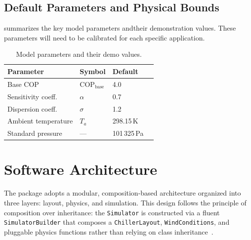 \documentclass[11pt, a4paper]{article}
\newcommand{\cop}{\mathrm{COP}}
\newcommand{\copbase}{\cop_{\mathrm{base}}}
\begin{document}
\subsection{Default Parameters and Physical Bounds}
\label{sec:parameters}

 summarizes the key model parameters andtheir demonstration values. These parameters will need to be calibrated for each specific application.

\begin{table}[htbp]
    \centering
    \caption{Model parameters and their demo values.}
    \label{tab:parameters}
    \begin{tabular}{@{}llll@{}}
        \toprule
        \textbf{Parameter} & \textbf{Symbol} & \textbf{Default} \\
        \midrule
        Base COP              & $\copbase$  & 4.0        \\
        Sensitivity coeff.    & $\alpha$    & 0.7        \\
        Dispersion coeff.     & $\sigma$    & 1.2        \\
        Ambient temperature   & $T_a$       & 298.15\,K   \\
        Standard pressure     & ---         & 101\,325\,Pa \\
        \bottomrule
    \end{tabular}
\end{table}

\section{Software Architecture}
\label{sec:architecture}

The package adopts a modular, composition-based architecture organized into three layers: layout, physics, and simulation.
This design follows the principle of composition over inheritance: the \texttt{Simulator} is constructed via a fluent \texttt{SimulatorBuilder} that composes a \texttt{ChillerLayout}, \texttt{WindConditions}, and pluggable physics functions rather than relying on class inheritance~\cite{ham2015dynamic}.
\end{document}
